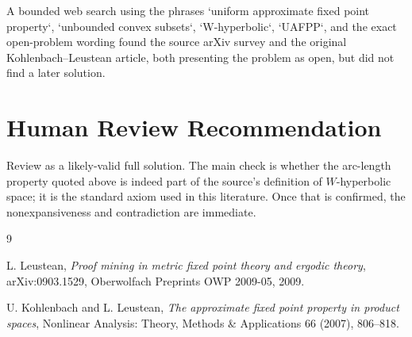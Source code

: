 \documentclass[11pt]{article}
\begin{document}
A bounded web search using the phrases `uniform approximate fixed point
property`, `unbounded convex subsets`, `W-hyperbolic`, `UAFPP`, and the exact
open-problem wording found the source arXiv survey and the original
Kohlenbach--Leustean article, both presenting the problem as open, but did not
find a later solution.

\section*{Human Review Recommendation}

Review as a likely-valid full solution. The main check is whether the
arc-length property quoted above is indeed part of the source's definition of
$W$-hyperbolic space; it is the standard axiom used in this literature. Once
that is confirmed, the nonexpansiveness and contradiction are immediate.

\begin{thebibliography}{9}

L. Leustean,
\emph{Proof mining in metric fixed point theory and ergodic theory},
arXiv:0903.1529, Oberwolfach Preprints OWP 2009-05, 2009.

U. Kohlenbach and L. Leustean,
\emph{The approximate fixed point property in product spaces},
Nonlinear Analysis: Theory, Methods \& Applications 66 (2007), 806--818.

\end{thebibliography}
\end{document}
